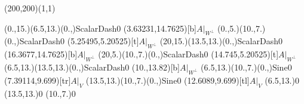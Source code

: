 \unitlength=1bp%

\begin{feynartspicture}(200,200)(1,1)

\FADiagram{}
\FAProp(0.,15.)(6.5,13.)(0.,){ScalarDash}{0}
\FALabel(3.63231,14.7625)[b]{$A|_{W^\perp}$}
\FAProp(0.,5.)(10.,7.)(0.,){ScalarDash}{0}
\FALabel(5.25495,5.20525)[t]{$A|_{W^\perp}$}
\FAProp(20,15.)(13.5,13.)(0.,){ScalarDash}{0}
\FALabel(16.3677,14.7625)[b]{$A|_{W^\perp}$}
\FAProp(20,5.)(10.,7.)(0.,){ScalarDash}{0}
\FALabel(14.745,5.20525)[t]{$A|_{W^\perp}$}
\FAProp(6.5,13.)(13.5,13.)(0.,){ScalarDash}{0}
\FALabel(10.,13.82)[b]{$A|_{W^\perp}$}
\FAProp(6.5,13.)(10.,7.)(0.,){Sine}{0}
\FALabel(7.39114,9.699)[tr]{$A|_V$}
\FAProp(13.5,13.)(10.,7.)(0.,){Sine}{0}
\FALabel(12.6089,9.699)[tl]{$A|_V$}
\FAVert(6.5,13.){0}
\FAVert(13.5,13.){0}
\FAVert(10.,7.){0}
\end{feynartspicture}

